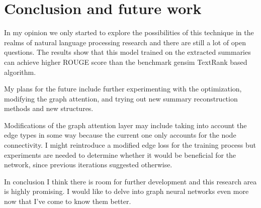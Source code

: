 \chapter{Conclusion and future work}\label{sect:Future}
In my opinion we only started to explore the possibilities of this technique in the realms of natural language processing research and there are still a lot of open questions. The results show that this model trained on the extracted summaries can achieve higher ROUGE score than the benchmark gensim TextRank based algorithm.

My plans for the future include further experimenting with the optimization, modifying the graph attention, and trying out new summary reconstruction methods and new structures.

Modifications of the graph attention layer may include taking into account the edge types in some way because the current one only accounts for the node connectivity. I might reintroduce a modified edge loss for the training process but experiments are needed to determine whether it would be beneficial for the network, since previous iterations suggested otherwise.

In conclusion I think there is room for further development and this research area is highly promising. I would like to delve into graph neural networks even more now that I've come to know them better.